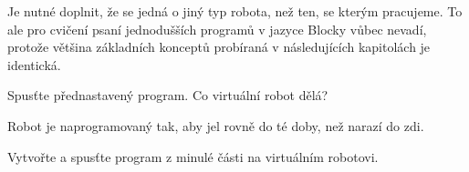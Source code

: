 \documentclass[main.tex]{subfiles}
\begin{document}
	Je nutné doplnit, že se jedná o jiný typ robota, než ten, se kterým pracujeme. To ale pro cvičení psaní jednodušších programů v jazyce Blocky vůbec nevadí, protože většina základních konceptů probíraná v následujících kapitolách je identická.

	\begin{question}
		Spusťte přednastavený program. Co virtuální robot dělá?
	\end{question}

	\begin{solution}
		Robot je naprogramovaný tak, aby jel rovně do té doby, než narazí do zdi.
	\end{solution}

	\begin{question}
		Vytvořte a spusťte program z minulé části na virtuálním robotovi.
	\end{question}
\end{document}
